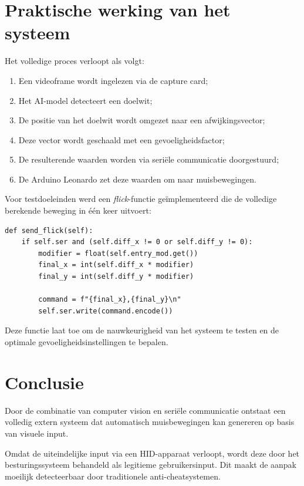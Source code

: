\section{Praktische werking van het systeem}

Het volledige proces verloopt als volgt:

\begin{enumerate}
    \item Een videoframe wordt ingelezen via de capture card;
    \item Het AI-model detecteert een doelwit;
    \item De positie van het doelwit wordt omgezet naar een afwijkingsvector;
    \item Deze vector wordt geschaald met een gevoeligheidsfactor;
    \item De resulterende waarden worden via seriële communicatie doorgestuurd;
    \item De Arduino Leonardo zet deze waarden om naar muisbewegingen.
\end{enumerate}

Voor testdoeleinden werd een \textit{flick}-functie geïmplementeerd die de volledige berekende beweging in één keer uitvoert:

\begin{verbatim}
def send_flick(self):
    if self.ser and (self.diff_x != 0 or self.diff_y != 0):
        modifier = float(self.entry_mod.get())
        final_x = int(self.diff_x * modifier)
        final_y = int(self.diff_y * modifier)
        
        command = f"{final_x},{final_y}\n"
        self.ser.write(command.encode())
\end{verbatim}

Deze functie laat toe om de nauwkeurigheid van het systeem te testen en de optimale gevoeligheidsinstellingen te bepalen.

\section{Conclusie}

Door de combinatie van computer vision en seriële communicatie ontstaat een volledig extern systeem dat automatisch muisbewegingen kan genereren op basis van visuele input.

Omdat de uiteindelijke input via een HID-apparaat verloopt, wordt deze door het besturingssysteem behandeld als legitieme gebruikersinput. Dit maakt de aanpak moeilijk detecteerbaar door traditionele anti-cheatsystemen.